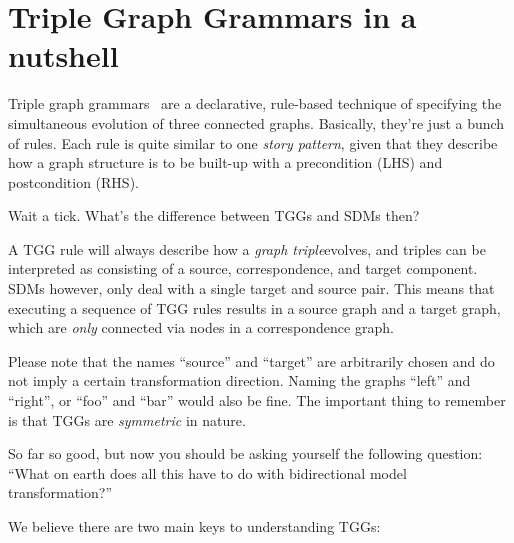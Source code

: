 \section{Triple Graph Grammars in a nutshell}
\label{sec:nutshell}
\genHeader

Triple graph grammars~\cite{tgg:schuerr_94,sk2008,Klar2010} are a declarative, rule-based technique of specifying the simultaneous evolution of three connected
graphs.  Basically, they're just a bunch of rules. Each rule is quite similar to one \emph{story pattern}, given that they describe how a graph structure is to
be built-up with a precondition (LHS) and postcondition (RHS).

Wait a tick. What's the difference between TGGs and SDMs then?

A TGG rule will always describe how a \emph{graph triple}evolves, and triples can be interpreted as consisting of a source,
correspondence, and target component. SDMs however, only deal with a single target and source pair. This means that executing a sequence of TGG rules results in
a source graph and a target graph, which are \emph{only} connected via nodes in a correspondence graph. 

Please note that the names ``source'' and ``target'' are arbitrarily chosen and do not imply a certain transformation direction. Naming the graphs ``left'' and ``right'', or ``foo'' and ``bar'' would also be fine. The
important thing to remember is that TGGs are \emph{symmetric} in nature.

So far so good, but now you should be asking yourself the following question: ``What on earth does all this have to do with bidirectional model transformation?''

\newpage

We believe there are two main keys to understanding TGGs:


